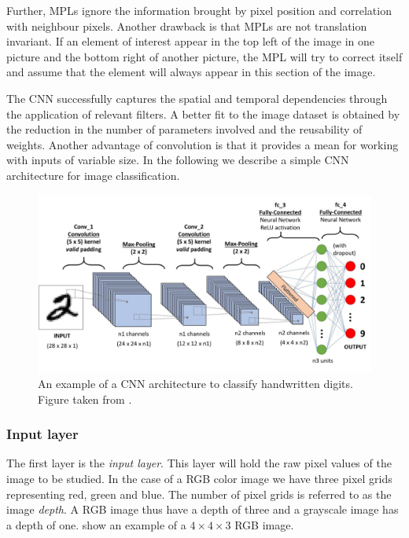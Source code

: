 \documentclass[../main.tex]{subfiles}
\begin{document}
Further, MPLs ignore the information brought by pixel position and correlation with neighbour pixels. Another drawback is that MPLs are not translation invariant. If an element of interest appear in the top left of the image in one picture and the bottom right of another picture, the MPL will try to correct itself and assume that the element will always appear in this section of the image. 

The CNN successfully captures the spatial and temporal dependencies through the application of relevant filters. A better fit to the image dataset is obtained by the reduction in the number of parameters involved and the reusability of weights. Another advantage of convolution is that it provides a mean for working with inputs of variable size. In the following we describe a simple CNN architecture for image classification. 

\begin{figure}[!htb]
    \centering
    \includegraphics[width=\textwidth]{doc/fig/ex-cnn.jpeg}
    \caption{An example of a CNN architecture to classify handwritten digits. Figure taken from \cite{sumit2018}.}
    \label{fig:example-cnn}
\end{figure}

\subsubsection{Input layer}
The first layer is the \textit{input layer}. This layer will hold the raw pixel values of the image to be studied. In the case of a RGB color image we have three pixel grids representing red, green and blue. The number of pixel grids is referred to as the image \textit{depth}. A RGB image thus have a depth of three and a grayscale image has a depth of one.  show an example of a \ensuremath{4\times4\times3} RGB image. 
\end{document}
